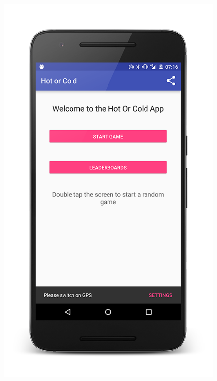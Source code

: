 \documentclass[10pt, a4paper]{article}
\begin{document}
\begin{figure}[!htb]
  \includegraphics[width=1.0\textwidth]{phone_snackbar_1}
  \caption{}
\endminipage\hfill
{}

\end{figure}
\end{document}
